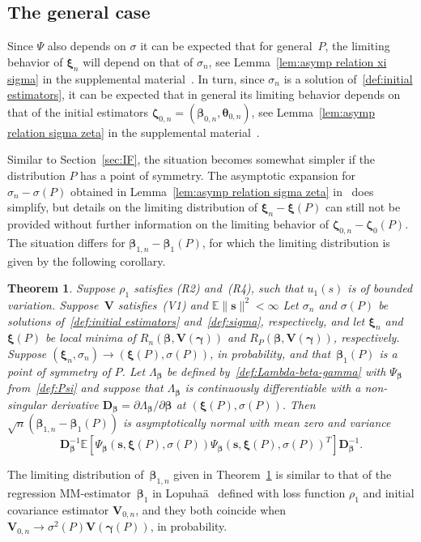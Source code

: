 \documentclass{article}
\numberwithin{equation}{section}
\theoremstyle{plain}
\newtheorem{theorem}{Theorem}
\newcommand{\bbeta}{\bm\beta}
\newcommand{\btheta}{\bm\theta}
\newcommand{\bxi}{\bm\xi}
\newcommand{\bgamma}{\bm\gamma}
\newcommand{\bzeta}{\bm\zeta}
\newcommand{\bs}{\mathbf{s}}
\newcommand{\bV}{\mathbf{V}}
\newcommand{\bD}{\mathbf{D}}
\newcommand{\E}{\mathbb{E}}
\begin{document}
\subsection{The general case}
\label{subsec:asymp norm general}
Since $\Psi$ also depends on $\sigma$ it can be expected that for general~$P$, 
the limiting behavior of $\bxi_n$ will depend on that of $\sigma_n$,
see Lemma~\ref{lem:asymp relation xi sigma} in the supplemental material~\cite{supplement2025}.
In turn, since $\sigma_n$ is a solution of~\eqref{def:initial estimators}, it can be expected
that in general its limiting behavior depends on that of the initial estimators 
$\bzeta_{0,n}=(\bbeta_{0,n},\btheta_{0,n})$, 
see Lemma~\ref{lem:asymp relation sigma zeta} in the supplemental material~\cite{supplement2025}.

Similar to Section~\ref{sec:IF}, the situation becomes somewhat simpler if the distribution $P$ 
has a point of symmetry.
The asymptotic expansion for $\sigma_n-\sigma(P)$ obtained in Lemma~\ref{lem:asymp relation sigma zeta} 
in~\cite{supplement2025} does simplify,
but details on the limiting distribution of $\bxi_n-\bxi(P)$ can still not be provided without further information on the limiting
behavior of $\bzeta_{0,n}-\bzeta_0(P)$.
The situation differs for $\bbeta_{1,n}-\bbeta_1(P)$, for which the 
limiting distribution is given by the following corollary.
\begin{theorem}
\label{th:asymp norm symmetry}
Suppose $\rho_1$ satisfies (R2) and~(R4), such that $u_1(s)$ is of bounded variation.
Suppose~$\bV$ satisfies~(V1) and $\E\|\bs\|^2<\infty$
Let $\sigma_n$ and $\sigma(P)$ be solutions of~\eqref{def:initial estimators} and~\eqref{def:sigma}, respectively,
and let $\bxi_n$ and~$\bxi(P)$ be local minima of $R_n(\bbeta,\bV(\bgamma))$ and 
$R_P(\bbeta,\bV(\bgamma))$, respectively.
Suppose $(\bxi_n,\sigma_n)\to(\bxi(P),\sigma(P))$, in probability,
and that~$\bbeta_1(P)$ is a point of symmetry of $P$.
Let $\Lambda_{\bbeta}$ be defined by~\eqref{def:Lambda-beta-gamma}
with $\Psi_{\bbeta}$ from~\eqref{def:Psi}
and suppose that $\Lambda_{\bbeta}$ is continuously differentiable with a non-singular derivative 
$\bD_{\bbeta}=\partial\Lambda_{\bbeta}/\partial\bbeta$ at $(\bxi(P),\sigma(P))$.
Then $\sqrt{n}(\bbeta_{1,n}-\bbeta_1(P))$ is asymptotically normal with mean zero and variance
\[
\bD_{\bbeta}^{-1}
\E\left[
\Psi_{\bbeta}(\mathbf{s},\bxi(P),\sigma(P))
\Psi_{\bbeta}(\mathbf{s},\bxi(P),\sigma(P))^T
\right]
\bD_{\bbeta}^{-1}.
\]
\end{theorem}
The limiting distribution of~$\bbeta_{1,n}$ given in Theorem~\ref{th:asymp norm symmetry}
is similar to that of the regression MM-estimator~$\bbeta_1$ in Lopuha\"a~\cite{lopuhaa2023}
defined with loss function $\rho_1$ and initial covariance estimator $\bV_{0,n}$,
and they both coincide when $\bV_{0,n}\to\sigma^2(P)\bV(\bgamma(P))$, in probability.
\end{document}
